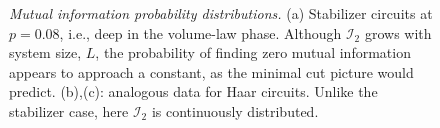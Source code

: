 \documentclass[prl,twocolumn,aps,showpacs,amsmath,amssymb,superscriptaddress,floatfix,longbibliography]{revtex4-1}
\begin{document}
\begin{figure}[htbp]
\centering
{}
\caption{\emph{Mutual information probability distributions.} (a) Stabilizer circuits at $p = 0.08$, i.e., deep in the volume-law phase. Although $\mathcal{I}_2$ grows with system size, $L$, the probability of finding zero mutual information appears to approach a constant, as the minimal cut picture would predict. (b),(c): analogous data for Haar circuits. Unlike the stabilizer case, here $\mathcal{I}_2$ is continuously distributed.}
	\label{fig:hist}
\end{figure}
\end{document}

